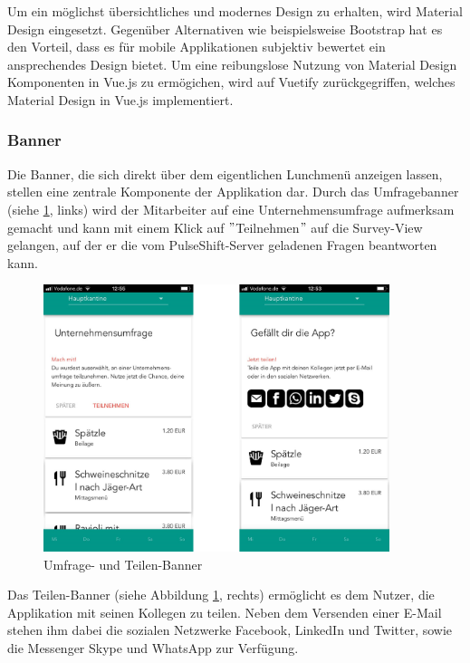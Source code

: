 Um ein möglichst übersichtliches und modernes Design zu erhalten, wird Material Design eingesetzt. Gegenüber Alternativen wie beispielsweise Bootstrap hat es den Vorteil, dass es für mobile Applikationen subjektiv bewertet ein ansprechendes Design bietet. Um eine reibungslose Nutzung von Material Design Komponenten in Vue.js zu ermögichen, wird auf Vuetify zurückgegriffen, welches Material Design in Vue.js implementiert.

\subsubsection{Banner}

Die Banner, die sich direkt über dem eigentlichen Lunchmenü anzeigen lassen, stellen eine zentrale Komponente der Applikation dar. Durch das Umfragebanner (siehe \ref{fig:banners}, links) wird der Mitarbeiter auf eine Unternehmensumfrage aufmerksam gemacht und kann mit einem Klick auf $"$Teilnehmen$"$ auf die Survey-View gelangen, auf der er die vom PulseShift-Server geladenen Fragen beantworten kann.

\begin{figure}[H]
\centering
\includegraphics[width=0.9\textwidth]{images/banners}
\caption[Umfrage- und Teilen-Banner]{Umfrage- und Teilen-Banner}
\label{fig:banners}
\end{figure}

Das Teilen-Banner (siehe Abbildung \ref{fig:banners}, rechts) ermöglicht es dem Nutzer, die Applikation mit seinen Kollegen zu teilen. Neben dem Versenden einer E-Mail stehen ihm dabei die sozialen Netzwerke Facebook, LinkedIn und Twitter, sowie die Messenger Skype und WhatsApp zur Verfügung.

